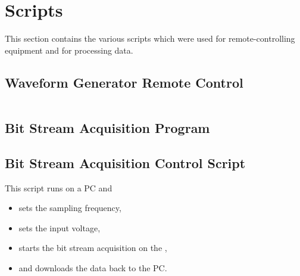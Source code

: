 \chapter{Scripts}
\label{app:chap:scripts}

This   section   contains   the   various  scripts   which   were   used   for
remote-controlling equipment and for processing data.

\section{Waveform Generator Remote Control}
\label{sec:app:33120A}
\inputminted{python}{code/33120A.py}

\section{Bit Stream Acquisition Program}
\label{sec:app:bitstream:acquisition}


\section{Bit Stream Acquisition Control Script}
\label{sec:app:bitstream:control}

This script runs on a PC and
\begin{itemize}\tightlist
    \item
    sets the sampling frequency,
    \item
    sets the input voltage,
    \item
    starts the bit stream acquisition on the \raspi,
    \item
    and downloads the data back to the PC.
\end{itemize}


